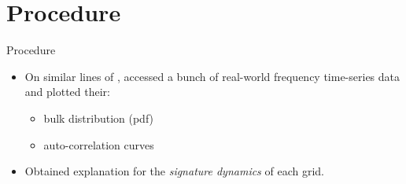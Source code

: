 \section[Procedure]{Procedure}
\label{sec:procedure}

\begin{frame}{Procedure}
	\begin{itemize}
		\item On similar lines of \cite{schafer01}, accessed a bunch of real-world frequency time-series data and plotted their:
			\begin{itemize}
				\item bulk distribution (pdf) 
				\item auto-correlation curves
			\end{itemize}
		\item Obtained explanation for the \textit{signature dynamics}	of each grid.		
	\end{itemize}
\end{frame}